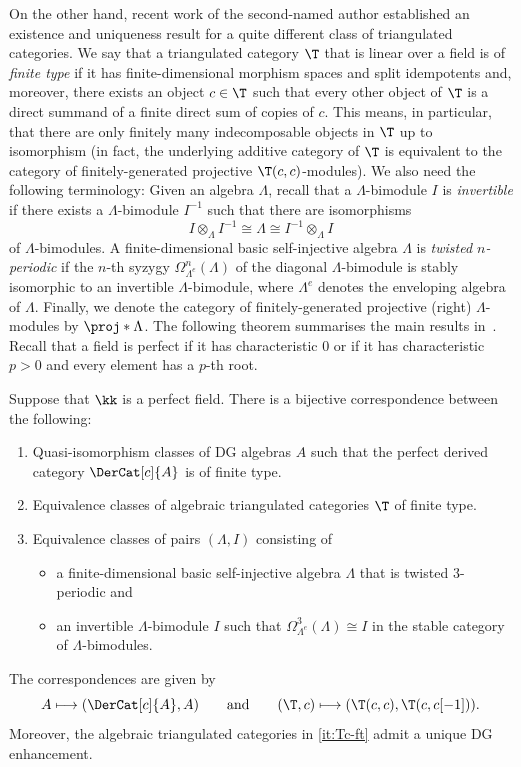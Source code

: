 \documentclass[a4paper]{amsart}
\begin{document}
On the other hand, recent work of the second-named author established an
existence and uniqueness result for a quite different class of triangulated
categories. We say that a triangulated category $\T$ that is linear over a field
is of \emph{finite type} if it has finite-dimensional morphism spaces and split
idempotents and, moreover, there exists an object $c\in\T$ such that every other
object of $\T$ is a direct summand of a finite direct sum of copies of $c$. This
means, in particular, that there are only finitely many indecomposable objects
in $\T$ up to isomorphism (in fact, the underlying additive category of $\T$ is
equivalent to the category of finitely-generated projective $\T(c,c)$-modules).
We also need the following terminology: Given an algebra $\Lambda$, recall that
a $\Lambda$-bimodule $I$ is \emph{invertible} if there exists a
$\Lambda$-bimodule $I^{-1}$ such that there are isomorphisms
\[
  I\otimes_\Lambda I^{-1} \cong\Lambda\cong I^{-1} \otimes_\Lambda I
\]
of $\Lambda$-bimodules. A finite-dimensional basic self-injective algebra
$\Lambda$ is \emph{twisted $n$-periodic} if the $n$-th syzygy
$\Omega_{\Lambda^e}^{n}(\Lambda)$ of the diagonal $\Lambda$-bimodule is stably
isomorphic to an invertible $\Lambda$-bimodule, where $\Lambda^e$ denotes the
enveloping algebra of $\Lambda$. Finally, we denote the category of
finitely-generated projective (right) $\Lambda$-modules by $\proj*{\Lambda}$.
The following theorem summarises the main results in~\cite{Mur22}. Recall that a
field is perfect if it has characteristic $0$ or if it has characteristic $p>0$
and every element has a $p$-th root.

\begin{theorem*}
  Suppose that $\kk$ is a perfect field. There is a bijective correspondence
  between the following:
  \begin{enumerate}
  \item Quasi-isomorphism classes of DG algebras $A$ such that the perfect
    derived category $\DerCat[c]{A}$ is of finite type.
  \item\label{it:Tc-ft} Equivalence classes of algebraic triangulated categories
    $\T$ of finite type.
  \item Equivalence classes of pairs $(\Lambda,I)$ consisting of
    \begin{itemize}
    \item a finite-dimensional basic self-injective algebra $\Lambda$ that is
      twisted $3$-periodic and
    \item an invertible $\Lambda$-bimodule $I$ such that
      $\Omega_{\Lambda^e}^3(\Lambda)\cong I$ in the stable category of
      $\Lambda$-bimodules.
    \end{itemize}
  \end{enumerate}
  The correspondences are given by
  \[
    A\longmapsto (\DerCat[c]{A},A)\qquad\text{and}\qquad(\T,c)\longmapsto (\T(c,c),\T(c,c[-1])).
  \]
  Moreover, the algebraic triangulated
  categories in \eqref{it:Tc-ft} admit a unique DG enhancement.
\end{theorem*}
\end{document}
